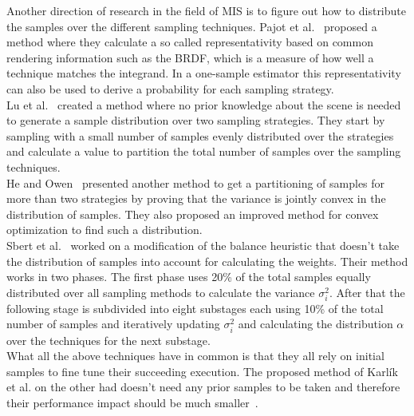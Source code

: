 Another direction of research in the field of MIS is to figure out how to distribute the samples over the different sampling techniques.
Pajot et al.~\cite{pajot} proposed a method where they calculate a so called representativity based on common rendering information such as the BRDF,
which is a measure of how well a technique matches the integrand.
In a one-sample estimator this representativity can also be used to derive a probability for each sampling strategy.\\
Lu et al.~\cite{lu} created a method where no prior knowledge about the scene is needed to generate a sample distribution over two sampling strategies.
They start by sampling with a small number of samples evenly distributed over the strategies
and calculate a value to partition the total number of samples over the sampling techniques.\\
He and Owen~\cite{he} presented another method to get a partitioning of samples for more than two strategies
by proving that the variance is jointly convex in the distribution of samples.
They also proposed an improved method for convex optimization to find such a distribution.\\
Sbert et al.~\cite{sbert} worked on a modification of the balance heuristic that doesn't take the distribution of samples into account for calculating the weights.
Their method works in two phases.
The first phase uses 20\% of the total samples equally distributed over all sampling methods to calculate the variance $ \sigma^2_i $.
After that the following stage is subdivided into eight substages each using 10\% of the total number of samples
and iteratively updating $ \sigma^2_i $ and calculating the distribution $ \alpha $ over the techniques for the next substage.\\
What all the above techniques have in common is that they all rely on initial samples to fine tune their succeeding execution.
The proposed method of Karl\'ik et al. on the other had doesn't need any prior samples to be taken and therefore their performance impact should be much smaller~\cite{Karlik2019}.




